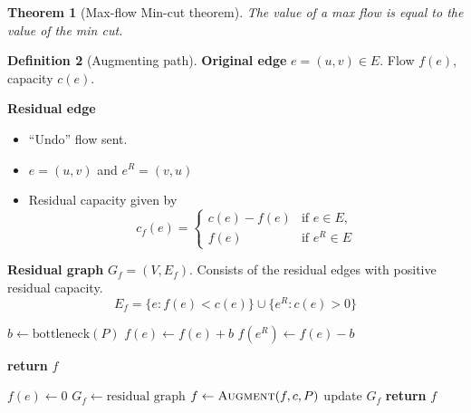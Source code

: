 \documentclass[10pt, oneside, reqno]{amsart}
\theoremstyle{plain}%
\newtheorem{thm}{Theorem}[section]
\theoremstyle{definition}
\newtheorem{defn}[thm]{Definition}
\theoremstyle{remark}
\begin{document}
\begin{thm}[Max-flow Min-cut theorem]
	The value of a max flow is equal to the value of the min cut.
\end{thm}

	
\begin{defn}[Augmenting path]
	\textbf{Original edge} $e = (u,v) \in E$.  Flow $f(e)$, capacity $c(e)$.
	
	\textbf{Residual edge}
	\begin{itemize}
		\item ``Undo'' flow sent. 
		\item $e = (u,v)$ and $e^R = (v,u)$
		\item Residual capacity given by \[
			c_f(e) = \begin{cases}
				c(e) - f(e) &\text{if $e \in E$},\\
				f(e) 		&\text{if $e^R \in E$}
			\end{cases}
		\]
	\end{itemize}
	
	\textbf{Residual graph} $G_f = (V, E_f)$.  Consists of the residual edges with positive residual capacity.\[
		E_f = \{ e:f(e) < c(e)\} \cup \{ e^R : c(e) > 0\}
	\]
\end{defn}	
	
	\begin{algorithm}[H]
		\label{alg:dynamic_rising_trend}
		\caption{Augments a path \textbf{P}}
		\begin{algorithmic}[1]
			\State $b \leftarrow \text{bottleneck}(P)$			
				  $f(e) \leftarrow f(e) + b$
				\Else{}  $f(e^R) \leftarrow f(e) - b$
				\EndIf
			\EndFor
			
			\State \textbf{return} $f$
		\EndProcedure
		\end{algorithmic}
	\end{algorithm}


\begin{algorithm}[H]
	\label{alg:dynamic_rising_trend}
	\caption{Finds the maximum flow}
	\begin{algorithmic}[1]

		 $f(e) \leftarrow 0$
		\EndFor
		\State $G_f \leftarrow \text{residual graph}$
			\State $f \leftarrow \textsc{Augment}(f, c, P)$
			\State update $G_f$
		\EndWhile
		\State \textbf{return} $f$
	\EndProcedure
	\end{algorithmic}
\end{algorithm}
\end{document}
